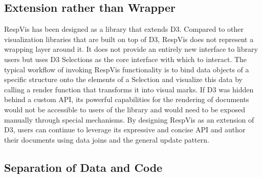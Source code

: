 
\subsection{Extension rather than Wrapper}

RespVis has been designed as a library that extends D3.  Compared to
other visualization libraries that are built on top of D3, RespVis
does not represent a wrapping layer around it.  It does not provide an
entirely new interface to library users but uses D3 Selections as the
core interface with which to interact.  The typical workflow of
invoking RespVis functionality is to bind data objects of a specific
structure onto the elements of a Selection and visualize this data by
calling a render function that transforms it into visual marks.  If D3
was hidden behind a custom API, its powerful capabilities for the
rendering of documents would not be accessible to users of the library
and would need to be exposed manually through special mechanisms.  By
designing RespVis as an extension of D3, users can continue to
leverage its expressive and concise API and author their documents
using data joins and the general update pattern.



\subsection{Separation of Data and Code}

